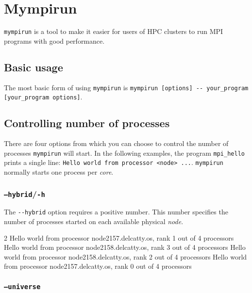 \chapter{Mympirun}
\label{ch:mympirun}

\lstinline|mympirun| is a tool to make it easier for users of HPC clusters to run
MPI programs with good performance.

\section{Basic usage}
\label{sec:myrun-basic-usage}

The most basic form of using \lstinline|mympirun| is \lstinline|mympirun [options] -- your_program [your_program options]|.

\section{Controlling number of processes}

There are four options from which you can choose to control the number of processes
\lstinline|mympirun| will start. In the following examples, the program \lstinline|mpi_hello|
prints a single line: \lstinline|Hello world from processor <node> ...|.
\lstinline|mympirun| normally starts one process per \emph{core}.

\subsection{\texttt{--hybrid}/\texttt{-h}}

The \lstinline|--hybrid| option requires a positive number. This number specifies
the number of processes started on each available physical \emph{node}.

\begin{prompt}
2
Hello world from processor node2157.delcatty.os, rank 1 out of 4 processors
Hello world from processor node2158.delcatty.os, rank 3 out of 4 processors
Hello world from processor node2158.delcatty.os, rank 2 out of 4 processors
Hello world from processor node2157.delcatty.os, rank 0 out of 4 processors
\end{prompt}

\subsection{\texttt{--universe}}

